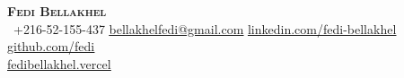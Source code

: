 \begin{center}
    \textbf{\Huge \scshape Fedi Bellakhel} \\ \vspace{1pt}
     \ \small +216-52-155-437 \quad
    \href{mailto:bellakhelfedi@gmail.com}{ \underline{bellakhelfedi@gmail.com}} \quad
    \href{https://www.linkedin.com/in/fedi-bellakhel/}{ \underline{linkedin.com/fedi-bellakhel}} \quad
    \href{https://github.com/fedei10}{ \underline{github.com/fedi}} \\ \quad
    \href{https://fedi-bellakhel-bbe0ojtcx-fedei10s-projects.vercel.app/}{ \underline{fedibellakhel.vercel}}
\end{center}